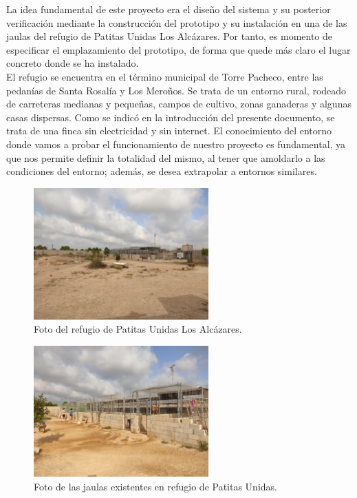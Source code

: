 \documentclass[12pt]{article}
\begin{document}
	\noindent La idea fundamental de este proyecto era el diseño del sistema y su posterior verificación mediante la construcción del prototipo y su instalación en una de las jaulas del refugio de Patitas Unidas Los Alcázares. Por tanto, es momento de especificar el emplazamiento del prototipo, de forma que quede más claro el lugar concreto donde se ha instalado. \\
	
	\noindent El refugio se encuentra en el término municipal de Torre Pacheco, entre las pedanías de Santa Rosalía y Los Meroños. Se trata de un entorno rural, rodeado de carreteras medianas y pequeñas, campos de cultivo, zonas ganaderas y algunas casas dispersas. Como se indicó en la introducción del presente documento, se trata de una finca sin electricidad y sin internet. El conocimiento del entorno donde vamos a probar el funcionamiento de nuestro proyecto es fundamental, ya que nos permite definir la totalidad del mismo, al tener que amoldarlo a las condiciones del entorno; además, se desea extrapolar a entornos similares. \\
	
	\begin{figure}[h!]
		\begin{center}
			\includegraphics[width=0.6\textwidth]{img/refugio_global.jpg}
			\caption{Foto del refugio de Patitas Unidas Los Alcázares.}
			\label{Foto global refugio}
		\end{center}
	\end{figure}
	
	\pagebreak

	\begin{figure}[h!]
		\begin{center}
			\includegraphics[width=0.6\textwidth]{img/refugio_jaulas.jpg}
			\caption{Foto de las jaulas existentes en refugio de Patitas Unidas.}
			\label{Foto jaulas refugio}
		\end{center}
	\end{figure}
	
\end{document}
